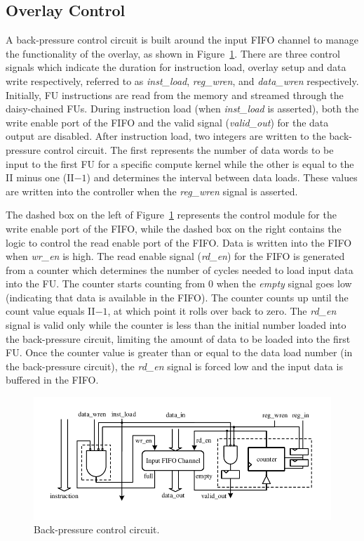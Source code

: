 \subsection{Overlay Control}
A back-pressure control circuit is built around the input FIFO channel to manage the functionality of the overlay, as shown in Figure~\ref{back_pressure}. 
There are three control signals which indicate the duration for instruction load, overlay setup and data write respectively, referred to as \textit{inst\_load}, \textit{reg\_wren}, and \textit{data\_wren} respectively. 
Initially, FU instructions are read from the memory and streamed through the daisy-chained FUs. 
During instruction load (when \textit{inst\_load} is asserted), both the write enable port of the FIFO and the valid signal (\textit{valid\_out}) for the data output are disabled. 
After instruction load, two integers are written to the back-pressure control circuit. 
The first represents the number of data words to be input to the first FU for a specific compute kernel while the other is equal to the II minus one (II$-1$) and determines the interval between data loads. 
These values are written into the controller when the \textit{reg\_wren} signal is asserted.

The dashed box on the left of Figure~\ref{back_pressure} represents the control module for the write enable port of the FIFO, while the dashed box on the right contains the logic to control the read enable port of the FIFO. 
Data is written into the FIFO when \textit{wr\_en} is high.
The read enable signal (\textit{rd\_en}) for the FIFO is generated from a counter which determines the number of cycles needed to load input data into the FU. 
The counter starts counting from 0 when the \textit{empty} signal goes low (indicating that data is available in the FIFO). The counter counts up until the count value equals II$-1$, at which point it rolls over back to zero.   
The \textit{rd\_en} signal is valid only while the counter is less than the initial number loaded into the back-pressure circuit, limiting the amount of data to be loaded into the first FU.
Once the counter value is greater than or equal to the data load number (in the back-pressure circuit), the \textit{rd\_en} signal is forced low and the input data is buffered in the FIFO.


\begin{figure}
	\centering
	\includegraphics[width=\columnwidth]{Figures/control.pdf}
	\caption{Back-pressure control circuit.}
	\label{back_pressure}
\end{figure}
	

